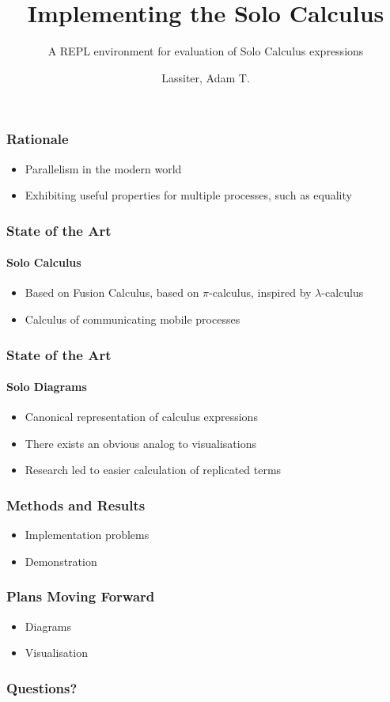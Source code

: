 \documentclass{beamer}
\title{Implementing the Solo Calculus}
\subtitle{A REPL environment for evaluation of Solo Calculus expressions}
\author{Lassiter, Adam T.}
\institute[University of Bath]{
    Department of Computer Science\\
    University of Bath
}
\begin{document}
    \frame{\titlepage}

    \begin{frame}
        \frametitle{Rationale}
        \begin{itemize}
            \item Parallelism in the modern world
            \item Exhibiting useful properties for multiple processes, such as equality
        \end{itemize}
    \end{frame}

    \begin{frame}
        \frametitle{State of the Art}
        \framesubtitle{Solo Calculus}
        \begin{itemize}
            \item Based on Fusion Calculus, based on $\pi$-calculus, inspired by $\lambda$-calculus
            \item Calculus of communicating mobile processes
        \end{itemize}
    \end{frame}
    
    \begin{frame}
        \frametitle{State of the Art}
        \framesubtitle{Solo Diagrams}
        \begin{itemize}
            \item Canonical representation of calculus expressions
            \item There exists an obvious analog to visualisations
            \item Research led to easier calculation of replicated terms
        \end{itemize}
    \end{frame}

    \begin{frame}
        \frametitle{Methods and Results}
        \begin{itemize}
            \item Implementation problems
            \item Demonstration
        \end{itemize}
    \end{frame}

    \begin{frame}
        \frametitle{Plans Moving Forward}
        \begin{itemize}
            \item Diagrams
            \item Visualisation
        \end{itemize}
    \end{frame}

    \begin{frame}
        \frametitle{Questions?}
    \end{frame}
\end{document}
